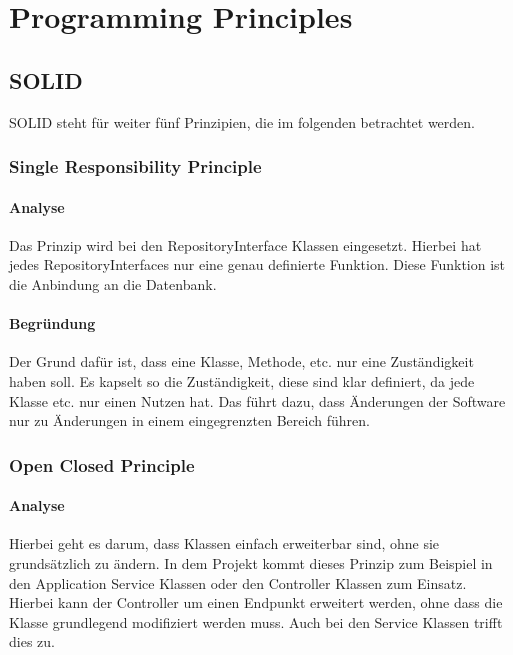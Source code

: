 
\chapter{Programming Principles}

\section{SOLID}
SOLID steht für weiter fünf Prinzipien, die im folgenden betrachtet werden.

    \subsection{Single Responsibility Principle}
    
        \subsubsection{Analyse}
        Das Prinzip wird bei den RepositoryInterface Klassen eingesetzt. Hierbei hat jedes RepositoryInterfaces nur eine genau definierte Funktion. Diese Funktion ist die Anbindung an die Datenbank.
        
        \subsubsection{Begründung}
        Der Grund dafür ist, dass eine Klasse, Methode, etc. nur eine Zuständigkeit haben soll. Es kapselt so die Zuständigkeit, diese sind klar definiert, da jede Klasse etc. nur einen Nutzen hat. Das führt dazu, dass Änderungen der Software nur zu Änderungen in einem eingegrenzten Bereich führen.

    \subsection{Open Closed Principle}
    
        \subsubsection{Analyse}
        Hierbei geht es darum, dass Klassen einfach erweiterbar sind, ohne sie grundsätzlich zu ändern. In dem Projekt kommt dieses Prinzip zum Beispiel in den Application Service Klassen oder den Controller Klassen zum Einsatz. Hierbei kann der Controller um einen Endpunkt erweitert werden, ohne dass die Klasse grundlegend modifiziert werden muss. Auch bei den Service Klassen trifft dies zu.
        
